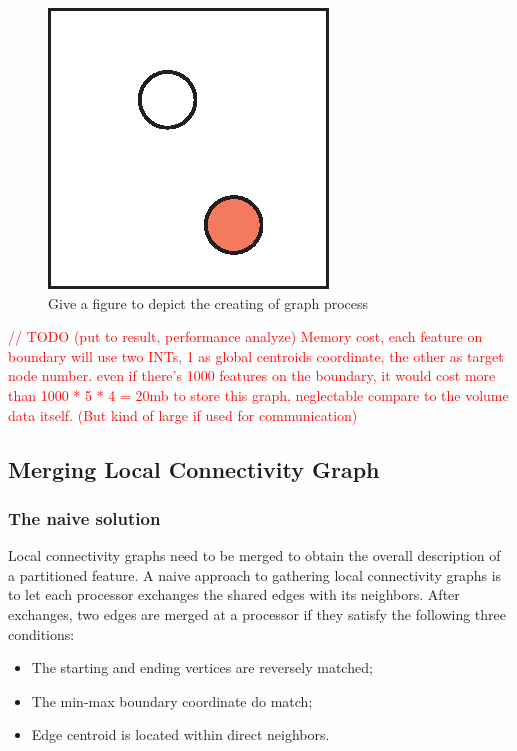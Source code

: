 \documentclass[10pt, conference, compsocconf]{IEEEtran}
\begin{document}
\begin{figure}[ht]
\centering
\includegraphics[width=0.45\linewidth]{blank.png}
\caption{Give a figure to depict the creating of graph process}
\label{fig:todo}
\end{figure}

\textcolor{red}{
// TODO (put to result, performance analyze)
Memory cost, each feature on boundary will use two INTs, 1 as global centroids coordinate, the other as target node number. even if there's 1000 features on the boundary, it would cost more than 1000 * 5 * 4 = 20mb to store this graph, neglectable compare to the volume data itself. (But kind of large if used for communication)
}

\subsection{Merging Local Connectivity Graph}

\subsubsection{The naive solution}

Local connectivity graphs need to be merged to obtain the overall description of a partitioned feature. A naive approach to gathering local connectivity graphs is to let each processor exchanges the shared edges with its neighbors. After exchanges, two edges are merged at a processor if they satisfy the following three conditions:

\begin{itemize}
\item The starting and ending vertices are reversely matched;
\item The min-max boundary coordinate do match;
\item Edge centroid is located within direct neighbors.
\end{itemize}
\end{document}

